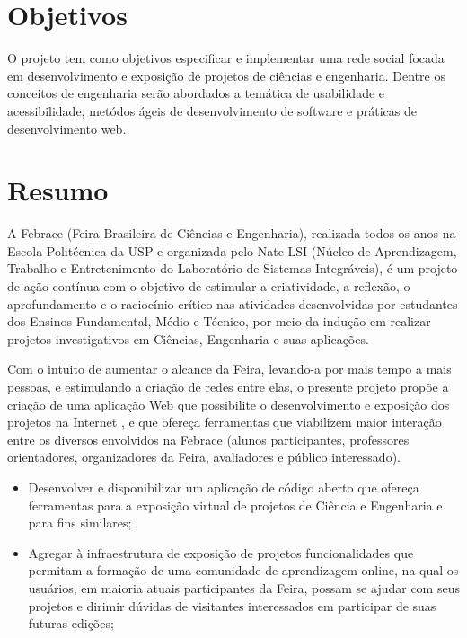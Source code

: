 \documentclass[a4paper,12pt,font=plain,header=plain]{abnt}
\begin{document}
  \setcounter{secnumdepth}{-1}
  \capa
  \folhaderosto

  \renewenvironment{center}{}{}
  \section{Objetivos}
    O projeto tem como objetivos especificar e implementar uma rede social
    focada em desenvolvimento e exposição de projetos de ciências e engenharia.
    Dentre os conceitos de engenharia serão abordados a temática de usabilidade
    e acessibilidade, metódos ágeis de desenvolvimento de software e práticas de
    desenvolvimento web.

  \section{Resumo}

    A Febrace (Feira Brasileira de Ciências e Engenharia), realizada todos os
    anos na Escola Politécnica da USP e organizada pelo Nate-LSI (Núcleo de
    Aprendizagem, Trabalho e Entretenimento do Laboratório de Sistemas
    Integráveis), é um projeto de ação contínua com o objetivo de estimular a
    criatividade, a reflexão, o aprofundamento e o raciocínio crítico nas
    atividades desenvolvidas por estudantes dos Ensinos Fundamental, Médio e
    Técnico, por meio da indução em realizar projetos investigativos em
    Ciências, Engenharia e suas aplicações.

    Com o intuito de aumentar o alcance da Feira, levando-a por mais tempo a
    mais pessoas, e estimulando a criação de redes entre elas, o presente
    projeto propõe a criação de uma aplicação Web que possibilite o
    desenvolvimento e exposição dos projetos na Internet
    \cite{andersson_software_2006}, e que ofereça
    ferramentas que viabilizem maior interação entre os diversos envolvidos na
    Febrace (alunos participantes, professores orientadores, organizadores da
    Feira, avaliadores e público interessado).

    \begin{itemize}
      \item{
        Desenvolver e disponibilizar um aplicação de código aberto que
        ofereça ferramentas para a exposição virtual de projetos de Ciência e
        Engenharia e para fins similares;
      }
      \item{
        Agregar à infraestrutura de exposição de projetos funcionalidades que
        permitam a formação de uma comunidade de aprendizagem online, na qual os
        usuários, em maioria atuais participantes da Feira, possam se ajudar com
        seus projetos e dirimir dúvidas de visitantes interessados em participar
        de suas futuras edições;
      }
    \end{itemize}
\end{document}
